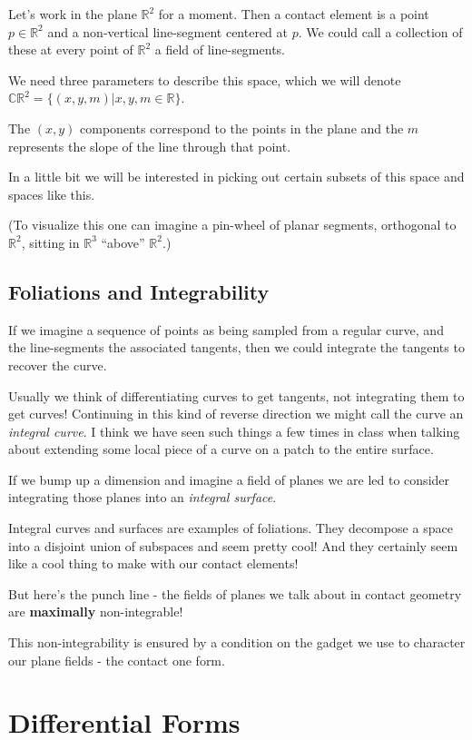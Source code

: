 \documentclass{article}
\begin{document}
Let's work in the plane $\mathbb{R}^{2}$ for a moment. Then a contact element is a point $p
\in \mathbb{R}^{2}$ and a non-vertical line-segment centered at $p$. We could
call a collection of these at every point of $\mathbb{R}^{2}$ a field of line-segments.

We need three parameters to describe this space, which we will denote
$\mathbb{CR}^{2} = \{ (x, y, m) | x, y, m \in \mathbb{R} \}$.

The $(x, y)$ components correspond to the points in the plane and the $m$
represents the slope of the line through that point.

In a little bit we will be interested in picking out certain subsets of this
space and spaces like this.

(To visualize this one can imagine a pin-wheel of planar segments, orthogonal to
$\mathbb{R}^{2}$, sitting in $\mathbb{R}^{3}$ ``above'' $\mathbb{R}^{2}$.)

\subsection {Foliations and Integrability}

If we imagine a sequence of points as being sampled from a regular curve, and the line-segments
the associated tangents, then we could integrate the tangents to recover the curve.

Usually we think of differentiating curves to get tangents, not integrating them
to get curves! Continuing in this kind of reverse direction we might call the curve an
\textit{integral curve}. I think we have seen such things a few times in class when
talking about extending some local piece of a curve on a patch to the entire surface.

If we bump up a dimension and imagine a field of planes we are led to consider
integrating those planes into an \textit{integral surface}.

Integral curves and surfaces are examples of foliations. They decompose a space
into a disjoint union of subspaces and seem pretty cool! And they certainly seem
like a cool thing to make with our contact elements!

But here's the punch line - the fields of planes we talk about in contact
geometry are \textbf{maximally} non-integrable!

This non-integrability is ensured by a condition on the gadget we use to
character our plane fields - the contact one form.

\section {Differential Forms}
\end{document}

